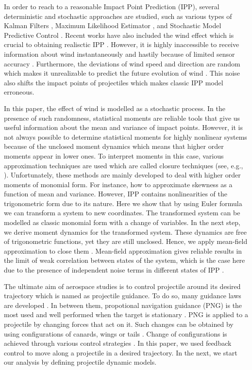 \documentclass[letterpaper, 10 pt, conference]{ieeeconf}  %
\begin{document}
In order to reach to a reasonable Impact Point Prediction (IPP), several deterministic and stochastic approaches are studied, such as various types of Kalman Filters \cite{fieee2005comparison}, Maximum Likelihood Estimator \cite{farina2006classification}, and Stochastic Model Predictive Control \cite{rogers2015stochastic}. Recent works have also included the wind effect which is crucial to obtaining realisctic IPP \cite{yuan2014impact}. However, it is highly inaccessible to receive information about wind instantaneously and hastily because of limited sensor accuracy \cite{yanushevsky2007modern}. Furthermore, the deviations of wind speed and direction are random which makes it unrealizable to predict the future evolution of wind \cite{manwell2010wind}. This noise also shifts the impact points of projectiles which makes classic IPP model erroneous.

In this paper, the effect of wind is modelled as a stochastic process. In the presence of such randomness, statistical moments are reliable tools that give us useful information about the mean and variance of impact points. However, it is not always possible to determine statistical moments for highly nonlinear systems because of the unclosed moment dynamics which  means that higher order moments appear in lower ones. To interpret moments in this case, various approximation techniques are used which are called closure techniques (see, e.g., \cite{soltani2015conditional,lee2009moment,gillespie2009moment,kuehn2016moment,singh2011approximate}). Unfortunately, these methods are mainly developed to deal with higher order moments of monomial form. For instance, how to approximate skewness as a function of mean and variance. However, IPP contains nonlinearities of the trigonometric form due to its nature. Here we show that by using Euler formula we can transform a system to new coordinates. The transformed system can be modelled  as classic monomial form with a change of variables. In the next step, we derive moment dynamics for the transformed system. These dynamics are free of trigonometric functions, yet they are still unclosed. Hence, we apply mean-field approximation to close them \cite{Tsarenko1992}. Mean-field approximation gives reliable results in the limit of weak correlation between states of the system, which is the case here due to the presence of independent noise terms in different states of IPP \cite{ghusinga2017approximate}. 

The ultimate aim of aerospace studies is to control projectile around its desired trajectory which is named as projectile guidance. To do so, many guidance laws are developed \cite{zhang2008analysis, metz1986terminal}. In between them, propotional navigation guidance (PNG) is the most used and well performed when the target is stationary \cite{wang2013stochastic}. PNG is applied to a projectile by changing forces that act on it. Such changes can be obtained by using configurations of canards, wings or tails \cite{yanushevsky2007modern}. Change of configurations is achieved through various control strategies \cite{rogers2015stochastic, gross2014impact, costel97pot}. In this paper, we used feedback control to move along a projectile in a desired trajectory. In the next, we start our analysis by defining projectile dynamic models.
\end{document}
